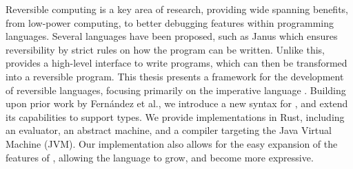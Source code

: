
Reversible computing\cite{IntroductionToReversibleComputing} is a key area of research, providing wide spanning benefits, from low-power computing\cite{landauerIrreversibility}, to better debugging features\cite{PrologDebugger} within programming languages. Several languages have been proposed, such as Janus\cite{Janus} which ensures reversibility by strict rules on how the program can be written. Unlike this, \rimplang provides a high-level interface to write programs, which can then be transformed into a reversible program.
This thesis presents a framework for the development of reversible languages, focusing primarily on the imperative language \rimplang. Building upon prior work by Fernández et al.\cite{Rimp}, we introduce a new syntax for \rimplang, and extend its capabilities to support types. We provide implementations in Rust, including an evaluator, an abstract machine, and a compiler targeting the Java Virtual Machine (JVM). Our implementation also allows for the easy expansion of the features of \rimplang, allowing the language to grow, and become more expressive.